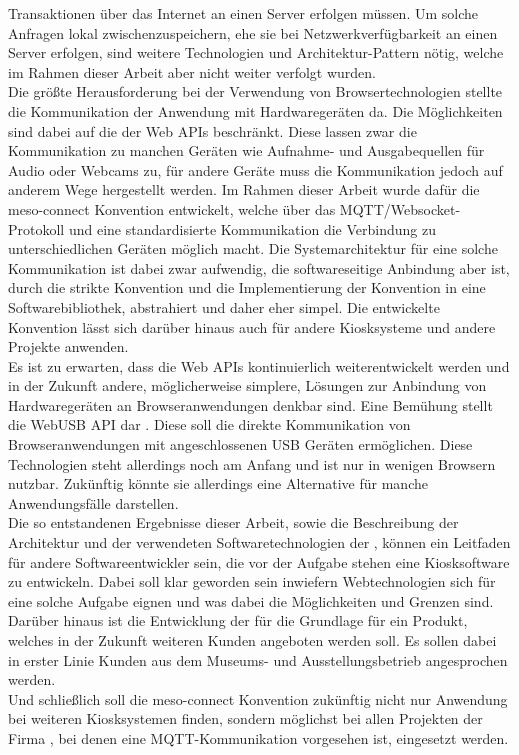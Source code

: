 Transaktionen über das Internet an einen Server erfolgen müssen. Um solche Anfragen lokal zwischenzuspeichern,
ehe sie bei Netzwerkverfügbarkeit an einen Server erfolgen, sind weitere Technologien und 
Architektur-Pattern nötig, welche im Rahmen dieser Arbeit aber nicht weiter verfolgt wurden.\\
Die größte Herausforderung bei der Verwendung von Browsertechnologien stellte die Kommunikation 
der Anwendung mit Hardwaregeräten da. 
Die Möglichkeiten sind dabei auf die der Web APIs beschränkt. Diese lassen zwar die Kommunikation zu manchen
Geräten wie Aufnahme- und Ausgabequellen für Audio oder Webcams zu, für andere Geräte muss die Kommunikation
jedoch auf anderem Wege hergestellt werden. Im Rahmen dieser Arbeit wurde dafür die meso-connect Konvention 
entwickelt, welche über das MQTT/Websocket-Protokoll und eine standardisierte Kommunikation die Verbindung
zu unterschiedlichen Geräten möglich macht. Die Systemarchitektur für eine solche Kommunikation ist dabei zwar
aufwendig, die softwareseitige Anbindung aber ist, durch die strikte Konvention und die Implementierung der Konvention
in eine Softwarebibliothek, abstrahiert und daher eher simpel. Die entwickelte Konvention lässt sich darüber 
hinaus auch für andere Kiosksysteme und andere Projekte anwenden.\\
Es ist zu erwarten, dass die Web APIs kontinuierlich weiterentwickelt werden und in der Zukunft andere,
möglicherweise simplere, Lösungen zur Anbindung von Hardwaregeräten an Browseranwendungen denkbar sind. Eine Bemühung
stellt die WebUSB API dar \cite{web-usb}. Diese soll die direkte Kommunikation von Browseranwendungen mit angeschlossenen
USB Geräten ermöglichen. Diese Technologien steht allerdings noch am Anfang und ist nur in wenigen Browsern 
nutzbar. Zukünftig könnte sie allerdings eine Alternative für manche Anwendungsfälle darstellen.\\

Die so entstandenen Ergebnisse dieser Arbeit, sowie die Beschreibung der Architektur und der verwendeten
Softwaretechnologien der \shst{}, können ein Leitfaden für andere Softwareentwickler sein, die 
vor der Aufgabe stehen eine Kiosksoftware zu entwickeln. Dabei soll klar geworden sein inwiefern 
Webtechnologien sich für eine solche Aufgabe eignen und was dabei die Möglichkeiten und Grenzen sind.\\
Darüber hinaus ist die Entwicklung der \shst{} für \meso{} die Grundlage für ein Produkt, 
welches in der Zukunft weiteren Kunden angeboten werden soll. Es sollen dabei in erster Linie Kunden 
aus dem Museums- und Ausstellungsbetrieb angesprochen werden.\\
Und schließlich soll die meso-connect Konvention zukünftig nicht nur Anwendung bei weiteren Kiosksystemen finden, sondern 
möglichst bei allen Projekten der Firma \meso{}, bei denen eine MQTT-Kommunikation vorgesehen ist, eingesetzt
werden.
